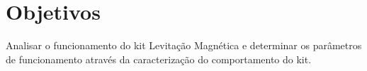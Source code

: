 \section{Objetivos}
Analisar o funcionamento do kit Levitação Magnética e determinar os parâmetros de funcionamento através da caracterização do comportamento do kit. 